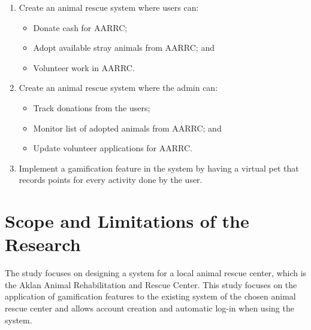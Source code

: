\begin{enumerate}
	\item Create an animal rescue system where users can:
	\begin{itemize}
		\item Donate cash for AARRC;
		\item Adopt available stray animals from AARRC; and
		\item Volunteer work in AARRC.
	\end{itemize}
	\item Create an animal rescue system where the admin can:
	\begin{itemize}
		\item Track donations from the users;
		\item Monitor list of adopted animals from AARRC; and
		\item Update volunteer applications for AARRC. 
	\end{itemize}
	
	\item Implement a gamification feature in the system by having a virtual pet that records points for every activity done by the user.
\end{enumerate}
	

\section{Scope and Limitations of the Research}
\label{sec:scopelimitations}

The study focuses on designing a system for a local animal rescue center, which
is the Aklan Animal Rehabilitation and Rescue Center. This study focuses on the
application of gamification features to the existing system of the chosen animal
rescue center and allows account creation and automatic log-in when using the
system.

\begin{comment}

%
%
Generally, one paragraph should be allotted for each of your research objectives.

Each paragraph contains a brief overview of the concept/theory and the purpose of doing the associated objective.

Each paragraph also includes a description of the scope/limitation of your study.

* Please refer to the slides for examples.

\end{comment}


